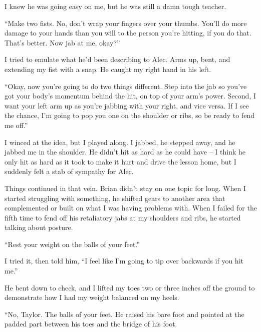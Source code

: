 I knew he was going easy on me, but he was still a damn tough teacher.



``Make two fists.  No, don't wrap your fingers over your thumbs.  You'll do more damage to your hands than you will to the person you're hitting, if you do that.  That's better.  Now jab at me, okay?''



I tried to emulate what he'd been describing to Alec.  Arms up, bent, and extending my fist with a snap.  He caught my right hand in his left.



``Okay, now you're going to do two things different.  Step into the jab so you've got your body's momentum behind the hit, on top of your arm's power.  Second, I want your left arm up as you're jabbing with your right, and vice versa.  If I see the chance, I'm going to pop you one on the shoulder or ribs, so be ready to fend me off.''



I winced at the idea, but I played along.  I jabbed, he stepped away, and he jabbed me in the shoulder.  He didn't hit as hard as he could have – I think he only hit as hard as it took to make it hurt and drive the lesson home, but I suddenly felt a stab of sympathy for Alec.



Things continued in that vein.  Brian didn't stay on one topic for long.  When I started struggling with something, he shifted gears to another area that complemented or built on what I was having problems with.  When I failed for the fifth time to fend off his retaliatory jabs at my shoulders and ribs, he started talking about posture.



``Rest your weight on the balls of your feet.''



I tried it, then told him, ``I feel like I'm going to tip over backwards if you hit me.''



He bent down to check, and I lifted my toes two or three inches off the ground to demonstrate how I had my weight balanced on my heels.



``No, Taylor.  The balls of your feet.  He raised his bare foot and pointed at the padded part between his toes and the bridge of his foot.



